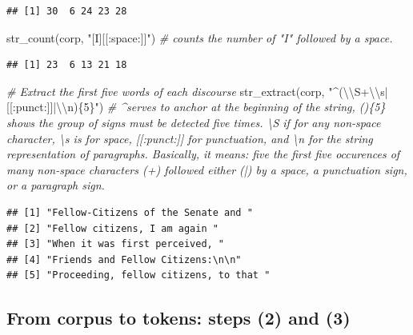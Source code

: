 \documentclass[
  12pt,
]{style/krantz}
\newenvironment{Shaded}{\begin{snugshade}}{\end{snugshade}}
\newcommand{\CommentTok}[1]{\textcolor[rgb]{0.56,0.35,0.01}{\textit{#1}}}
\newcommand{\FunctionTok}[1]{\textcolor[rgb]{0.00,0.00,0.00}{#1}}
\newcommand{\NormalTok}[1]{#1}
\newcommand{\SpecialCharTok}[1]{\textcolor[rgb]{0.00,0.00,0.00}{#1}}
\newcommand{\StringTok}[1]{\textcolor[rgb]{0.31,0.60,0.02}{#1}}
\begin{document}
\begin{verbatim}
## [1] 30  6 24 23 28
\end{verbatim}

\begin{Shaded}
\begin{Highlighting}[]
\FunctionTok{str\_count}\NormalTok{(corp, }\StringTok{"[I][[:space:]]"}\NormalTok{) }\CommentTok{\# counts the number of "I" followed by a space.}
\end{Highlighting}
\end{Shaded}

\begin{verbatim}
## [1] 23  6 13 21 18
\end{verbatim}

\begin{Shaded}
\begin{Highlighting}[]
\CommentTok{\# Extract the first five words of each discourse}
\FunctionTok{str\_extract}\NormalTok{(corp, }\StringTok{"\^{}(}\SpecialCharTok{\textbackslash{}\textbackslash{}}\StringTok{S+}\SpecialCharTok{\textbackslash{}\textbackslash{}}\StringTok{s|[[:punct:]]|}\SpecialCharTok{\textbackslash{}\textbackslash{}}\StringTok{n)\{5\}"}\NormalTok{) }\CommentTok{\# \^{}serves to anchor at the beginning of the string, ()\{5\} shows the group of signs must be detected five times. \textbackslash{}S if for any non{-}space character,  \textbackslash{}s is for space, [[:punct:]] for punctuation, and \textbackslash{}n for the string representation of paragraphs. Basically, it means: five the first five occurences of many non{-}space characters (+) followed either (|) by a space, a punctuation sign, or a paragraph sign.}
\end{Highlighting}
\end{Shaded}

\begin{verbatim}
## [1] "Fellow-Citizens of the Senate and "   
## [2] "Fellow citizens, I am again "         
## [3] "When it was first perceived, "        
## [4] "Friends and Fellow Citizens:\n\n"     
## [5] "Proceeding, fellow citizens, to that "
\end{verbatim}

\hfill\break

\hypertarget{from-corpus-to-tokens-steps-2-and-3}{%
\subsection{From corpus to tokens: steps (2) and (3)}\label{from-corpus-to-tokens-steps-2-and-3}}
\end{document}
